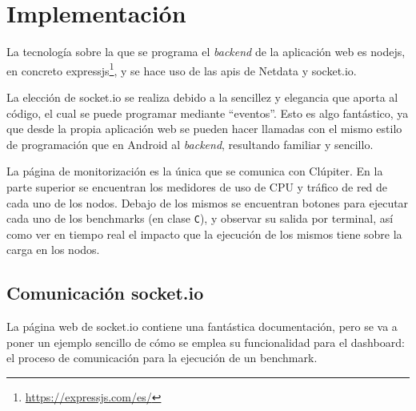 \section{Implementación}
La tecnología sobre la que se programa el \textit{\gls{backend}} de la aplicación web es nodejs, en concreto expressjs\footnote{\url{https://expressjs.com/es/}}, y se hace uso de las \acrshort{api}s de Netdata y socket.io.

La elección de socket.io se realiza debido a la sencillez y elegancia que aporta al código, el cual se puede programar mediante ``eventos''. Esto es algo fantástico, ya que desde la propia aplicación web se pueden hacer llamadas con el mismo estilo de programación que en Android al \textit{backend}, resultando familiar y sencillo.

La página de monitorización es la única que se comunica con Clúpiter. En la parte superior se encuentran los medidores de uso de CPU y tráfico de red de cada uno de los nodos. Debajo de los mismos se encuentran botones para ejecutar cada uno de los benchmarks (en clase \texttt{C}), y observar su salida por terminal, así como ver en tiempo real el impacto que la ejecución de los mismos tiene sobre la carga en los nodos.

\subsection{Comunicación socket.io}
\label{ssec:socket.io_comm}
La página web de socket.io contiene una fantástica documentación, pero se va a poner un ejemplo sencillo de cómo se emplea su funcionalidad para el dashboard: el proceso de comunicación para la ejecución de un benchmark.

